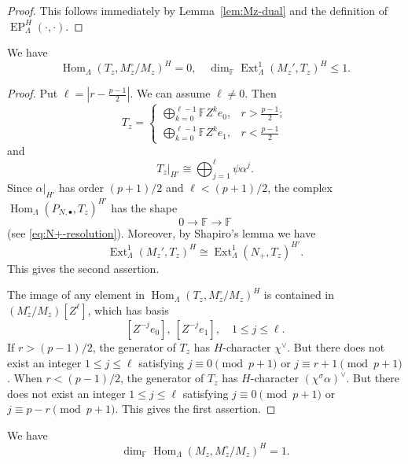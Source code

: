 \documentclass[11pt,a4paper]{article} %
\def\FF{\mathbb{F}}
\def\dim{\operatorname{dim}}
\def\EP{\operatorname{EP}}
\def\Ext{\operatorname{Ext}} %
\def\Hom{\operatorname{Hom}}
\begin{document}
\begin{proof}
    This follows immediately by Lemma~\ref{lem:Mz-dual} and the definition of $\EP_\Lambda^H(\cdot,\cdot)$.
\end{proof}

\begin{lemma}\label{lem:T}
    We have
    \[
    \Hom_\Lambda(T_z,M_z^\circ/M_z)^H=0,\quad\dim_\FF\Ext^1_\Lambda(M_z',T_z)^H\leq1.
    \]
\end{lemma}
\begin{proof}
    Put $\ell=|r-\frac{p-1}{2}|$. We can assume $\ell\ne0$. Then
    \[
    T_z=
    \begin{cases}
        \bigoplus_{k=0}^{\ell-1}\FF Z^ke_0, &r>\frac{p-1}{2};\\
        \bigoplus_{k=0}^{\ell-1}\FF Z^ke_1, &r<\frac{p-1}{2}
    \end{cases}
    \]
    and
    \[
    T_z|_{H'}\cong\bigoplus_{j=1}^{\ell}\psi\alpha^j.
    \]
    Since $\alpha|_{H'}$ has order $(p+1)/2$ and
    $\ell<(p+1)/2$, the complex
    $\Hom_\Lambda(P_{N,\bullet},T_z)^{H'}$ has the shape
    \[
    0\longrightarrow\FF\longrightarrow\FF
    \]
    (see \eqref{eq:N+-resolution}). Moreover, by Shapiro's lemma we have
    \[
    \Ext^1_\Lambda(M_z',T_z)^H\cong\Ext^1_\Lambda(N_+,T_z)^{H'}.
    \]
    This gives the second assertion.

    The image of any element in $\Hom_\Lambda(T_z,M_z^\circ/M_z)^H$ is contained in $(M_z^\circ/M_z)[Z^\ell]$, which has basis
    \[
    [Z^{-j}e_0],\ [Z^{-j}e_1],\quad 1\leq j\leq\ell.
    \]
    If $r>(p-1)/2$, the generator of $T_z$ has $H$-character $\chi^\vee$. But there does not exist an integer $1\leq j\leq\ell$ satisfying $j\equiv0\pmod{p+1}$ or $j\equiv r+1\pmod{p+1}$.
    When $r<(p-1)/2$, the generator of $T_z$ has $H$-character
    $(\chi^\sigma\alpha)^\vee$. But there does not exist an integer $1\leq j\leq\ell$ satisfying
    $j\equiv0\pmod{p+1}$ or $j\equiv p-r\pmod{p+1}$. This gives the first assertion.
\end{proof}

\begin{lemma}\label{lem:Hom-1-dimensional}
    We have
    \[
    \dim_\FF\Hom_\Lambda(M_z,M_z^\circ/M_z)^H=1.
    \]
\end{lemma}
\end{document}
